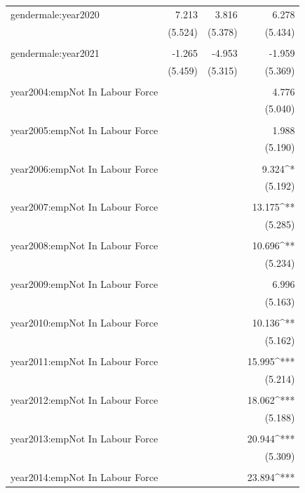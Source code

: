 \documentclass[
]{article}
\begin{document}
\begin{table}[!htbp]
\begin{tabular}{@{\extracolsep{5pt}}lD{.}{.}{-3} D{.}{.}{-3} D{.}{.}{-3} }
 gendermale:year2020 & 7.213 & 3.816 & 6.278 \\ 
  & (5.524) & (5.378) & (5.434) \\ 
  & & & \\ 
 gendermale:year2021 & -1.265 & -4.953 & -1.959 \\ 
  & (5.459) & (5.315) & (5.369) \\ 
  & & & \\ 
 year2004:empNot In Labour Force &  &  & 4.776 \\ 
  &  &  & (5.040) \\ 
  & & & \\ 
 year2005:empNot In Labour Force &  &  & 1.988 \\ 
  &  &  & (5.190) \\ 
  & & & \\ 
 year2006:empNot In Labour Force &  &  & 9.324^{*} \\ 
  &  &  & (5.192) \\ 
  & & & \\ 
 year2007:empNot In Labour Force &  &  & 13.175^{**} \\ 
  &  &  & (5.285) \\ 
  & & & \\ 
 year2008:empNot In Labour Force &  &  & 10.696^{**} \\ 
  &  &  & (5.234) \\ 
  & & & \\ 
 year2009:empNot In Labour Force &  &  & 6.996 \\ 
  &  &  & (5.163) \\ 
  & & & \\ 
 year2010:empNot In Labour Force &  &  & 10.136^{**} \\ 
  &  &  & (5.162) \\ 
  & & & \\ 
 year2011:empNot In Labour Force &  &  & 15.995^{***} \\ 
  &  &  & (5.214) \\ 
  & & & \\ 
 year2012:empNot In Labour Force &  &  & 18.062^{***} \\ 
  &  &  & (5.188) \\ 
  & & & \\ 
 year2013:empNot In Labour Force &  &  & 20.944^{***} \\ 
  &  &  & (5.309) \\ 
  & & & \\ 
 year2014:empNot In Labour Force &  &  & 23.894^{***} \\ 

\end{tabular}
\end{table}
\end{document}
